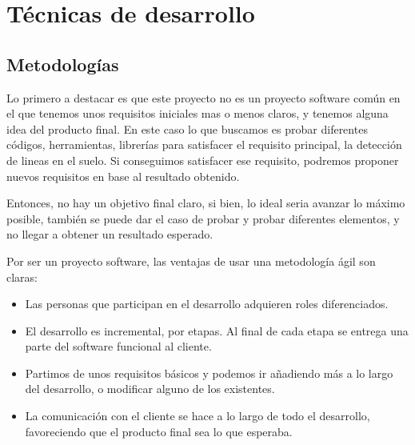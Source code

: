 
\section{Técnicas de desarrollo}

\subsection{Metodologías}

Lo primero a destacar es que este proyecto no es un proyecto software común en el que tenemos unos requisitos iniciales mas o menos claros, y tenemos alguna idea del producto final. En este caso lo que buscamos es probar diferentes códigos, herramientas, librerías para satisfacer el requisito principal, la detección de lineas en el suelo. Si conseguimos satisfacer ese requisito, podremos proponer nuevos requisitos en base al resultado obtenido.

Entonces, no hay un objetivo final claro, si bien, lo ideal seria avanzar lo máximo posible, también se puede dar el caso de probar y probar diferentes elementos, y no llegar a obtener un resultado esperado.

Por ser un proyecto software, las ventajas de usar una metodología ágil son claras:
\begin{itemize}
	\item Las personas que participan en el desarrollo adquieren roles diferenciados.
	\item El desarrollo es incremental, por etapas. Al final de cada etapa se entrega una parte del software funcional al cliente.
	\item Partimos de unos requisitos básicos y podemos ir añadiendo más a lo largo del desarrollo, o modificar alguno de los existentes.
	\item La comunicación con el cliente se hace a lo largo de todo el desarrollo, favoreciendo que el producto final sea lo que esperaba.
\end{itemize}

